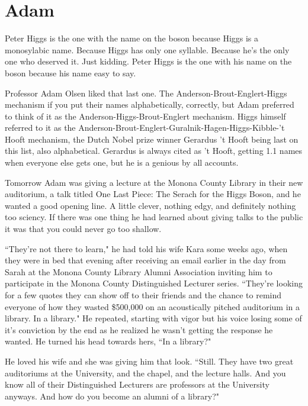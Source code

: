 %
%

\chapter*{Adam}

Peter Higgs is the one with the name on the boson because Higgs is a monosylabic name. Because Higgs has only one syllable. Because he's the only one who deserved it. Just kidding. Peter Higgs is the one with his name on the boson because his name easy to say.

Professor Adam Olsen liked that last one. The Anderson-Brout-Englert-Higgs mechanism if you put their names alphabetically, correctly, but Adam preferred to think of it as the Anderson-Higgs-Brout-Englert mechanism. Higgs himself referred to it as the Anderson-Brout-Englert-Guralnik-Hagen-Higgs-Kibble-'t Hooft mechanism, the Dutch Nobel prize winner Gerardus 't Hooft being last on this list, also alphabetical. Gerardus is always cited as 't Hooft, getting 1.1 names when everyone else gets one, but he is a genious by all accounts. 

Tomorrow Adam was giving a lecture at the Monona County Library in their new auditorium, a talk titled One Last Piece: The Serach for the Higgs Boson, and he wanted a good opening line. A little clever, nothing edgy, and definitely nothing too sciency. If there was one thing he had learned about giving talks to the public it was that you could never go too shallow. 

``They're not there to learn," he had told his wife Kara some weeks ago, when they were in bed that evening after receiving an email earlier in the day from Sarah at the Monona County Library Alumni Association inviting him to participate in the Monona County Distinguished Lecturer series. ``They're looking for a few quotes they can show off to their friends and the chance to remind everyone of how they wasted \$500,000 on an acoustically pitched auditorium in a library. In a library." He repeated, starting with vigor but his voice losing some of it's conviction by the end as he realized he wasn't getting the response he wanted. He turned his head towards hers, ``In a library?" 

He loved his wife and she was giving him that look. ``Still. They have two great auditoriums at the University, and the chapel, and the lecture halls. And you know all of their Distinguished Lecturers are professors at the University anyways. And how do you become an alumni of a library?" 

